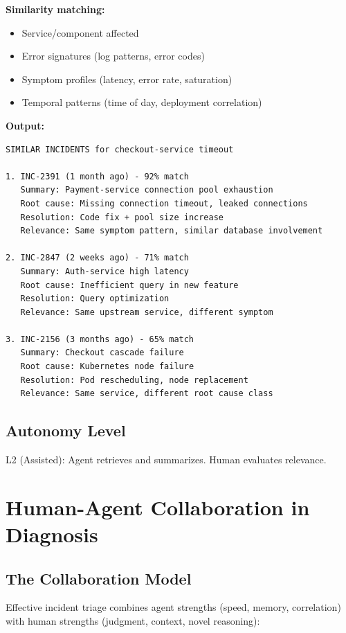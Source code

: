 \textbf{Similarity matching:}
\begin{itemize}
    \item Service/component affected
    \item Error signatures (log patterns, error codes)
    \item Symptom profiles (latency, error rate, saturation)
    \item Temporal patterns (time of day, deployment correlation)
\end{itemize}

\textbf{Output:}

\begin{lstlisting}[caption={Similar Incident Retrieval Output}]
SIMILAR INCIDENTS for checkout-service timeout

1. INC-2391 (1 month ago) - 92% match
   Summary: Payment-service connection pool exhaustion
   Root cause: Missing connection timeout, leaked connections
   Resolution: Code fix + pool size increase
   Relevance: Same symptom pattern, similar database involvement

2. INC-2847 (2 weeks ago) - 71% match
   Summary: Auth-service high latency
   Root cause: Inefficient query in new feature
   Resolution: Query optimization
   Relevance: Same upstream service, different symptom

3. INC-2156 (3 months ago) - 65% match
   Summary: Checkout cascade failure
   Root cause: Kubernetes node failure
   Resolution: Pod rescheduling, node replacement
   Relevance: Same service, different root cause class
\end{lstlisting}

\subsection{Autonomy Level}

L2 (Assisted): Agent retrieves and summarizes. Human evaluates relevance.

\section{Human-Agent Collaboration in Diagnosis}
\label{sec:collaboration}

\subsection{The Collaboration Model}
\label{subsec:collaboration-model}

Effective incident triage combines agent strengths (speed, memory, correlation) with human strengths (judgment, context, novel reasoning):

